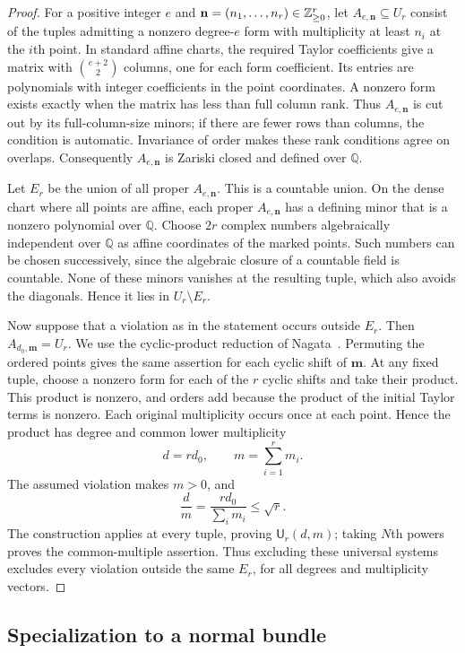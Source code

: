 \begin{proof}
For a positive integer $e$ and
$\mathbf n=(n_1,\ldots,n_r)\in\mathbb Z_{\ge0}^r$, let
$A_{e,\mathbf n}\subseteq U_r$ consist of the tuples admitting a nonzero
degree-$e$ form with multiplicity at least $n_i$ at the $i$th point.
In standard affine charts, the required Taylor coefficients give a
matrix with $\binom{e+2}{2}$ columns, one for each form coefficient.
Its entries are polynomials with integer coefficients in the point
coordinates.  A nonzero form exists exactly when the matrix has less
than full column rank.  Thus $A_{e,\mathbf n}$ is cut out by its
full-column-size minors; if there are fewer rows than columns, the
condition is automatic.  Invariance of order makes these rank
conditions agree on overlaps.  Consequently $A_{e,\mathbf n}$ is
Zariski closed and defined over $\mathbb Q$.

Let $E_r$ be the union of all proper $A_{e,\mathbf n}$.  This is a
countable union.  On the dense chart where all points are affine,
each proper $A_{e,\mathbf n}$ has a defining minor that is a nonzero
polynomial over $\mathbb Q$.  Choose
$2r$ complex numbers algebraically independent over $\mathbb Q$ as
affine coordinates of the marked points.  Such numbers can be chosen
successively, since the algebraic closure of a countable field is
countable.  None of these minors vanishes at the resulting tuple, which
also avoids the diagonals.  Hence it lies in $U_r\setminus E_r$.

Now suppose that a violation as in the statement occurs outside $E_r$.
Then $A_{d_0,\mathbf m}=U_r$.  We use the cyclic-product reduction of
Nagata~\cite{Nagata1965}.
Permuting the ordered points gives the
same assertion for each cyclic shift of $\mathbf m$.  At any fixed
tuple, choose a nonzero form for each of the $r$ cyclic shifts and
take their product.  This product is nonzero, and orders add because
the product of the initial Taylor terms is nonzero.  Each original
multiplicity occurs once at each point.  Hence the product has degree
and common lower multiplicity
\[
 d=rd_0,
 \qquad
 m=\sum_{i=1}^r m_i.
\]
The assumed violation makes $m>0$, and
\[
 \frac d m
 =\frac{r d_0}{\sum_i m_i}
 \le\sqrt r.
\]
The construction applies at every tuple, proving $\mathsf U_r(d,m)$;
taking $N$th powers proves the common-multiple assertion.  Thus
excluding these universal systems excludes every violation outside
the same $E_r$, for all degrees and multiplicity vectors.
\end{proof}

\subsection{Specialization to a normal bundle}

